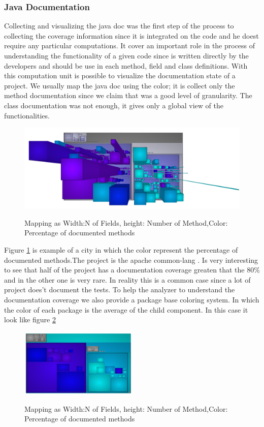 \documentclass[]{usiinfbachelorproject}
\begin{document}
\subsubsection{Java Documentation}
Collecting and visualizing the java doc was the first step of the process to collecting the coverage information since it is integrated on the code and he doest require any  particular computations. It cover an important role in the process of understanding the functionality of a given code since is written directly by the developers and should be use in each method, field and class definitions.
With this computation unit is possible to visualize the documentation state of a project. We usually map the java doc using the color; it is collect only the method documentation since we claim that was a good level of granularity. The class documentation was not enough, it gives only a global view of the functionalities.

\begin{figure}[H]
	\centering
	\includegraphics[width=1\textwidth]{images/javaDoc}
	\label{fig:javaDoc}
	\caption[Java Documentation Mapping]{Mapping as Width:N of Fields, height: Number of Method,Color: Percentage of documented methods}

\end{figure}

Figure \ref{fig:javaDoc} is example of a city in which the color represent the percentage of documented methods.The project is the apache common-lang . Is very interesting to see that half of the project has a documentation coverage greaten that the 80\% and in the other one is very rare. In reality this is a common case since a lot of project does't document the tests.
To help the analyzer to understand the documentation coverage we also provide a package base coloring system. In which the color of each package is the average of the child component. In  this case it look like figure \ref{fig:OnlyPackage}

\begin{figure}[H]
	\centering
	\includegraphics[width=0.5\textwidth]{images/javaDocOnlyPackage}
	\label{fig:OnlyPackage}
	\caption[Java Documentation Mapping Only Package]{Mapping as Width:N of Fields, height: Number of Method,Color: Percentage of documented methods}
\end{figure}
\end{document}

